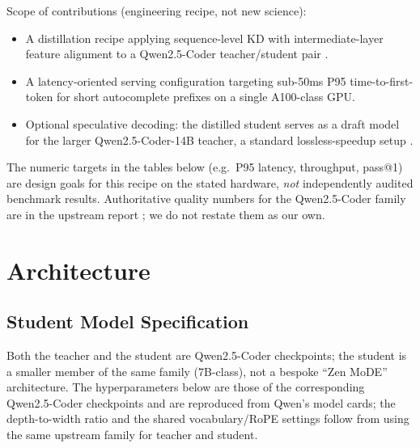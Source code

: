 \documentclass[11pt,a4paper]{article}
\begin{document}
Scope of contributions (engineering recipe, not new science):

\begin{itemize}
  \item A distillation recipe applying sequence-level KD with intermediate-layer feature alignment to
        a Qwen2.5-Coder teacher/student pair \cite{qwen25coder}.
  \item A latency-oriented serving configuration targeting sub-50ms P95 time-to-first-token for short
        autocomplete prefixes on a single A100-class GPU.
  \item Optional speculative decoding: the distilled student serves as a draft model for the larger
        Qwen2.5-Coder-14B teacher, a standard lossless-speedup setup
        \cite{leviathan2023speculative,chen2023accelerating}.
\end{itemize}

\noindent The numeric targets in the tables below (e.g.\ P95 latency, throughput, pass@1) are design
goals for this recipe on the stated hardware, \emph{not} independently audited benchmark results.
Authoritative quality numbers for the Qwen2.5-Coder family are in the upstream report
\cite{qwen25coder}; we do not restate them as our own.

\section{Architecture}

\subsection{Student Model Specification}

Both the teacher and the student are Qwen2.5-Coder \cite{qwen25coder} checkpoints; the student is a
smaller member of the same family (7B-class), not a bespoke ``Zen MoDE'' architecture. The
hyperparameters below are those of the corresponding Qwen2.5-Coder checkpoints and are reproduced from
Qwen's model cards; the depth-to-width ratio and the shared vocabulary/RoPE settings follow from using
the same upstream family for teacher and student.
\end{document}
